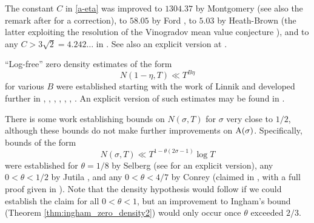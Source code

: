 The constant $C$ in \eqref{a-eta} was improved to $1304.37$ by Montgomery \cite[Theorem 12.3]{montgomery_topics_1971} (see also the remark after \cite[(11.97)]{ivic} for a correction), to $58.05$ by Ford \cite{FordZeta}, to $5.03$ by Heath-Brown \cite{heathbrown_new_2017} (the latter exploiting the resolution of the Vinogradov mean value conjecture \cite{bourgain_demeter_guth}), and to any $C > 3\sqrt{2}=4.242\dots$ in \cite{pintz_density_2023}. See also an explicit version at \cite{bellotti}.

``Log-free'' zero density estimates of the form
$$ N(1-\eta,T) \ll T^{B\eta}$$
for various $B$ were established starting with the work of Linnik \cite{linnik-1,linnik-2} and developed further in \cite{turan}, \cite{fogels}, \cite{bombieri_1974}, \cite{jutila_linnik}, \cite{gallagher_large_sieve}, \cite{graham_1978}, \cite{heath_brown_least_prime}. An explicit version of such estimates may be found in \cite{bellotti_2024}.

There is some work establishing bounds on $N(\sigma,T)$ for $\sigma$ very close to $1/2$, although these bounds do not make further improvements on $\mathrm{A}(\sigma)$.  Specifically, bounds of the form
$$ N(\sigma,T) \ll T^{1-\theta(2\sigma-1)} \log T$$
were established for $\theta=1/8$ by Selberg \cite{selberg_1946} (see \cite{simonic} for an explicit version), any $0 < \theta < 1/2$ by Jutila \cite{jutila-critical}, and any $0 < \theta < 4/7$ by Conrey (claimed in \cite{conrey_at_1989}, with a full proof given in \cite{baluyot_thesis}).  Note that the density hypothesis would follow if we could establish the claim for all $0 < \theta < 1$, but an improvement to Ingham's bound (Theorem \ref{thm:ingham_zero_density2}) would only occur once $\theta$ exceeded $2/3$.
